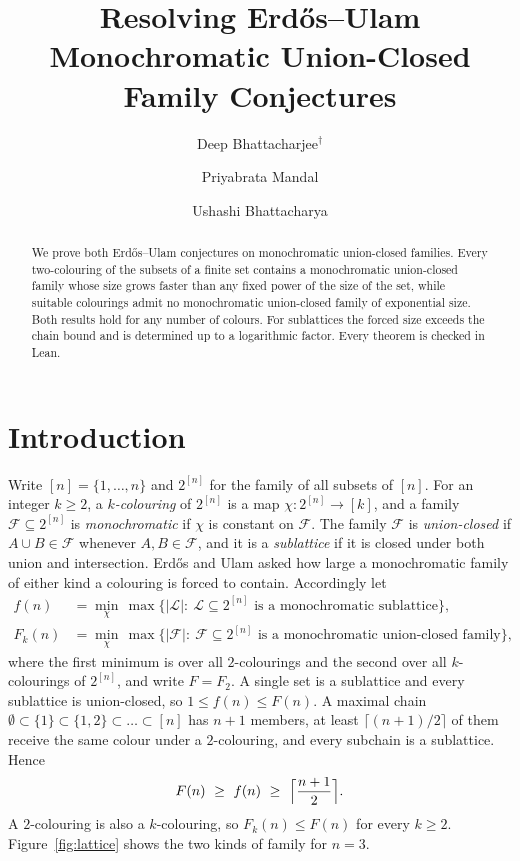 \documentclass[11pt,reqno]{amsart}
\title[Erd\H{o}s--Ulam union-closed family conjectures]{Resolving
Erd\H{o}s--Ulam Monochromatic Union-Closed Family Conjectures}
\author[D. Bhattacharjee]{Deep Bhattacharjee$^{\dagger}$}
\author[P. Mandal]{Priyabrata Mandal}
\author[U. Bhattacharya]{Ushashi Bhattacharya}
\date{}
\numberwithin{equation}{section}
\theoremstyle{plain}
\theoremstyle{definition}
\theoremstyle{remark}
\newcommand{\cF}{\mathcal{F}}
\newcommand{\cL}{\mathcal{L}}
\begin{document}
\sloppy

\begin{abstract}
We prove both Erd\H{o}s--Ulam conjectures on monochromatic union-closed
families. Every two-colouring of the subsets of a finite set contains a
monochromatic union-closed family whose size grows faster than any fixed
power of the size of the set, while suitable colourings admit no
monochromatic union-closed family of exponential size. Both results hold
for any number of colours. For sublattices the forced size exceeds the
chain bound and is determined up to a logarithmic factor. Every theorem
is checked in Lean.
\end{abstract}

\maketitle

\section{Introduction}
\label{sec:intro}

Write $[n]=\{1,\dots,n\}$ and $2^{[n]}$ for the family of all subsets of
$[n]$. For an integer $k\ge2$, a \emph{$k$-colouring} of $2^{[n]}$ is a
map $\chi:2^{[n]}\to[k]$, and a family $\cF\subseteq2^{[n]}$ is
\emph{monochromatic} if $\chi$ is constant on $\cF$. The family $\cF$ is
\emph{union-closed} if $A\cup B\in\cF$ whenever $A,B\in\cF$, and it is a
\emph{sublattice} if it is closed under both union and intersection.
Erd\H{o}s and Ulam asked how large a monochromatic family of either kind
a colouring is forced to contain. Accordingly let
\begin{align*}
f(n)&=\min_{\chi}\,\max\bigl\{|\cL|:\ \cL\subseteq2^{[n]}
  \text{ is a monochromatic sublattice}\bigr\},\\
F_k(n)&=\min_{\chi}\,\max\bigl\{|\cF|:\ \cF\subseteq2^{[n]}
  \text{ is a monochromatic union-closed family}\bigr\},
\end{align*}
where the first minimum is over all $2$-colourings and the second over
all $k$-colourings of $2^{[n]}$, and write $F=F_2$. A single set is a
sublattice and every sublattice is union-closed, so $1\le f(n)\le F(n)$.
A maximal chain $\emptyset\subset\{1\}\subset\{1,2\}\subset\dots\subset[n]$
has $n+1$ members, at least $\lceil(n+1)/2\rceil$ of them receive the same
colour under a $2$-colouring, and every subchain is a sublattice. Hence
\begin{equation}
\label{eq:trivial}
F(n)\ \ge\ f(n)\ \ge\ \Bigl\lceil\frac{n+1}{2}\Bigr\rceil .
\end{equation}
A $2$-colouring is also a $k$-colouring, so $F_k(n)\le F(n)$ for every
$k\ge2$. Figure~\ref{fig:lattice} shows the two kinds of family for $n=3$.
\end{document}

